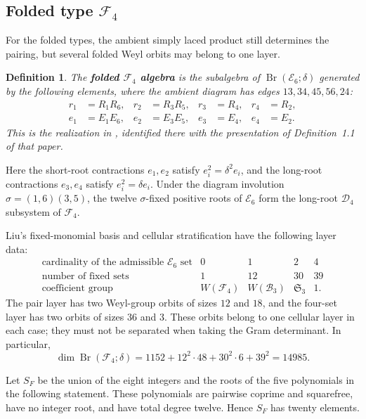 \documentclass[11pt,a4paper]{amsart}
\newcommand{\Br}{\operatorname{Br}}\newcommand{\Irr}{\operatorname{Irr}}
\theoremstyle{uprightdefinition}
\newtheorem{definition}[theorem]{Definition}
\theoremstyle{remark}\newtheorem{remark}[theorem]{Remark}
\begin{document}
\subsection{Folded type \texorpdfstring{$\mathscr{F}_4$}{F4}}
\label{subsec:type-F4}
\label{subsec:f4-certified}

For the folded types, the ambient simply laced product still determines
the pairing, but several folded Weyl orbits may belong to one layer.

\begin{definition}\label{def:f4-model}
The \textbf{folded $\mathscr{F}_4$ algebra} is the subalgebra of
$\Br(\mathscr{E}_6;\delta)$ generated by the following elements, where the
ambient diagram has edges $13,34,45,56,24$:
\[
 \begin{aligned}
 r_1&=R_1R_6,& r_2&=R_3R_5,& r_3&=R_4,& r_4&=R_2,\\
 e_1&=E_1E_6,& e_2&=E_3E_5,& e_3&=E_4,& e_4&=E_2.
 \end{aligned}
\]
This is the realization in \cite[Theorem~1.2]{LiuF42013},
identified there with the presentation of Definition~1.1 of that paper.
\end{definition}

Here the short-root contractions $e_1,e_2$ satisfy $e_i^2=\delta^2e_i$, and the
long-root contractions $e_3,e_4$ satisfy $e_i^2=\delta e_i$. Under the diagram involution $\sigma=(1,6)(3,5)$, the twelve $\sigma$-fixed positive
roots of $\mathscr{E}_6$ form the long-root $\mathscr{D}_4$
subsystem of $\mathscr{F}_4$.

Liu's fixed-monomial basis and cellular stratification
\cite[Corollaries 5.1--5.2 and Theorem 6.5]{LiuF42013} have the following
layer data:
\[
\begin{array}{c|rrrr}
\text{cardinality of the admissible }\mathscr{E}_6\text{ set}&0&1&2&4\\
\text{number of fixed sets}&1&12&30&39\\
\text{coefficient group}&W(\mathscr{F}_4)&W(\mathscr{B}_3)&\mathfrak S_3&1.
\end{array}
\]
The pair layer has two Weyl-group orbits of sizes $12$ and $18$, and the
four-set layer has two orbits of sizes $36$ and $3$. These orbits belong
to one cellular layer in each case; they must not be separated when taking
the Gram determinant. In particular,
\[
 \dim\Br(\mathscr{F}_4;\delta)=1152+12^2\cdot48+30^2\cdot6+39^2=14985.
\]

Let $S_F$ be the union of the eight integers and the roots of the
five polynomials in the following statement. These polynomials are
pairwise coprime and squarefree, have no integer root, and have total
degree twelve. Hence $S_F$ has twenty elements.
\end{document}
